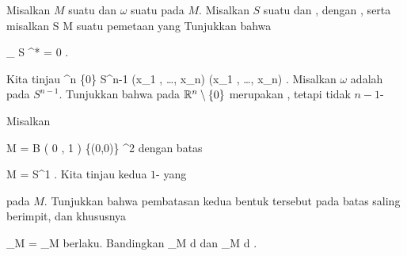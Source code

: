 {}
{

Misalkan $M$ suatu
dan $\omega$ suatu
 
pada $M$. Misalkan $S$ suatu
 dan
 {} {},
dengan
,
serta misalkan
\maabbdisp {\varphi} { S } { M
} {}
suatu pemetaan yang
Tunjukkan bahwa

\mavergleichskettedisp
{\vergleichskette
{
\int_{  S  }   \varphi^*\omega
}
{ =} { 0
}
{ } {
}
{ } {
}
{ } {
}
}
{}{}{.}

}
{} {}

{}
{

Kita tinjau
 {} {}
\maabbeledisp {\pi} {\R^n \setminus \{0\}} { S^{n-1}
} {(x_1 , \ldots , x_n) } { {  } (x_1 , \ldots , x_n)
} {.}
Misalkan $\omega$ adalah
pada $S^{n-1}$. Tunjukkan bahwa
\mathl{\pi^* \omega}{} pada ${\mathbb R}^n \setminus \{0\}$ merupakan
,
tetapi tidak
$n-1$-

}
{} {}

{}
{

Misalkan

\mavergleichskette
{\vergleichskette
{ M
}
{ = }{ B  \left(  0 , 1 \right) \setminus \{(0,0)\}
}
{ \subset }{ \R^2
}
{    }{
}
{   }{
}
}
{}{}{}
dengan batas

\mavergleichskette
{\vergleichskette
{ \partial M
}
{ = }{ S^1
}
{  }{
}
{    }{
}
{   }{
}
}
{}{}{.}
Kita tinjau kedua
$1$-
yang

 {  }

pada $M$. Tunjukkan bahwa pembatasan kedua bentuk tersebut pada batas saling berimpit, dan khususnya

\mavergleichskette
{\vergleichskette
{ \int_{\partial M} \omega
}
{ =} { \int_{\partial M} \tau
}
{  }{
}
{    }{
}
{   }{
}
}
{}{}{}
berlaku. Bandingkan
\mathkor {} {\int_M d \omega} {dan} {\int_M d \tau} {.}

}
{} {}

